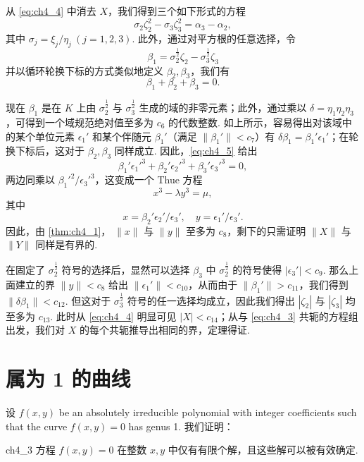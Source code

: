 从 \eqref{eq:ch4_4} 中消去 $X$，我们得到三个如下形式的方程
\[
\sigma_2 \zeta_2^2 - \sigma_3 \zeta_3^2 = \alpha_3 - \alpha_2,
\]
其中 $\sigma_j = \xi_j/\eta_j \ (j = 1, 2, 3)$. 此外，通过对平方根的任意选择，令
\[
\beta_1 = \sigma_2^{\frac{1}{2}} \zeta_2 - \sigma_3^{\frac{1}{2}} \zeta_3
\]
并以循环轮换下标的方式类似地定义 $\beta_2, \beta_3$，我们有
\begin{equation} \label{eq:ch4_5}\tag{5}
\beta_1 + \beta_2 + \beta_3 = 0.
\end{equation}

现在 $\beta_1$ 是在 $K$ 上由 $\sigma_2^{\frac{1}{2}}$ 与 $\sigma_3^{\frac{1}{2}}$ 生成的域的非零元素；此外，通过乘以 $\delta = \eta_1 \eta_2 \eta_3$，可得到一个域规范绝对值至多为 $c_6$ 的代数整数. 如上所示，容易得出对该域中的某个单位元素 $\epsilon_1'$ 和某个伴随元 $\beta_1'$（满足 $\|\beta_1'\| < c_7$）有 $\delta \beta_1 = \beta_1' \epsilon_1'$；在轮换下标后，这对于 $\beta_2, \beta_3$ 同样成立. 因此，\eqref{eq:ch4_5} 给出
\[
\beta_1' \epsilon_1'^3 + \beta_2' \epsilon_2'^3 + \beta_3' \epsilon_3'^3 = 0,
\]
两边同乘以 $\beta_1'^2 / \epsilon_3'^3$，这变成一个 Thue 方程
\[
x^3 - \lambda y^3 = \mu,
\]
其中
\[
x = \beta_2' \epsilon_2' / \epsilon_3', \quad y = \epsilon_1' / \epsilon_3'.
\]
因此，由 \autoref{thm:ch4_1}， $\|x\|$ 与 $\|y\|$ 至多为 $c_8$，剩下的只需证明 $\|X\|$ 与 $\|Y\|$ 同样是有界的.

在固定了 $\sigma_2^{\frac{1}{2}}$ 符号的选择后，显然可以选择 $\beta_3$ 中 $\sigma_2^{\frac{1}{2}}$ 的符号使得 $|\epsilon_3'| < c_9$. 那么上面建立的界 $\|y\| < c_8$ 给出 $\|\epsilon_1'\| < c_{10}$，从而由于 $\|\beta_1'\| > c_{11}$，我们得到 $\|\delta \beta_1\| < c_{12}$. 但这对于 $\sigma_3^{\frac{1}{2}}$ 符号的任一选择均成立，因此我们得出 $|\zeta_2|$ 与 $|\zeta_3|$ 均至多为 $c_{13}$. 此时从 \eqref{eq:ch4_4} 明显可见 $|X| < c_{14}$；从与 \eqref{eq:ch4_3} 共轭的方程组出发，我们对 $X$ 的每个共轭推导出相同的界，定理得证.

\section{属为 1 的曲线}\label{sec:ch4_4}

设 $f(x,y)$ be an absolutely irreducible polynomial with integer coefficients such that the curve $f(x, y) = 0$ has genus 1. 我们证明：

\begin{mythm}{}{ch4_3}
方程 $f(x,y) = 0$ 在整数 $x, y$ 中仅有有限个解，且这些解可以被有效确定.
\end{mythm}

